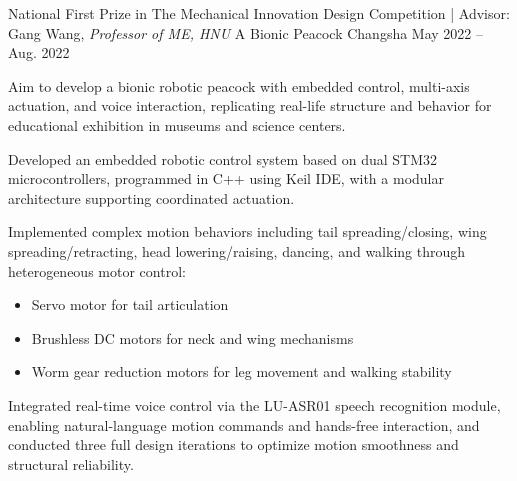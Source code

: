 \begin{cventries}
    \cventry
      {National First Prize in The Mechanical Innovation Design Competition | Advisor: Gang Wang, \textit{Professor of ME, HNU}} %
      {A Bionic Peacock} %
      {Changsha} %
      {May 2022 -- Aug. 2022} %
      {
        Aim to develop a bionic robotic peacock with embedded control, multi-axis actuation, and voice interaction, replicating real-life structure and behavior for educational exhibition in museums and science centers.
        \vspace{4.5mm}
        \begin{cvitems} %
          \item{Developed an embedded robotic control system based on dual STM32 microcontrollers, programmed in C++ using Keil IDE, with a modular architecture supporting coordinated actuation.}
          \item{Implemented complex motion behaviors including tail spreading/closing, wing spreading/retracting, head lowering/raising, dancing, and walking through heterogeneous motor control:
          \begin{itemize}
            \item Servo motor for tail articulation
            \item Brushless DC motors for neck and wing mechanisms
            \item Worm gear reduction motors for leg movement and walking stability
          \end{itemize}}
          \item{Integrated real-time voice control via the LU-ASR01 speech recognition module, enabling natural-language motion commands and hands-free interaction, and conducted three full design iterations to optimize motion smoothness and structural reliability.}
		      \end{cvitems}
      }    

  
    
\end{cventries}
